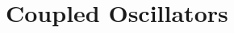 \documentclass[a4paper,11pt]{article}
\begin{document}
\section{Coupled Oscillators}\label{sec:interactions}




\end{document}
